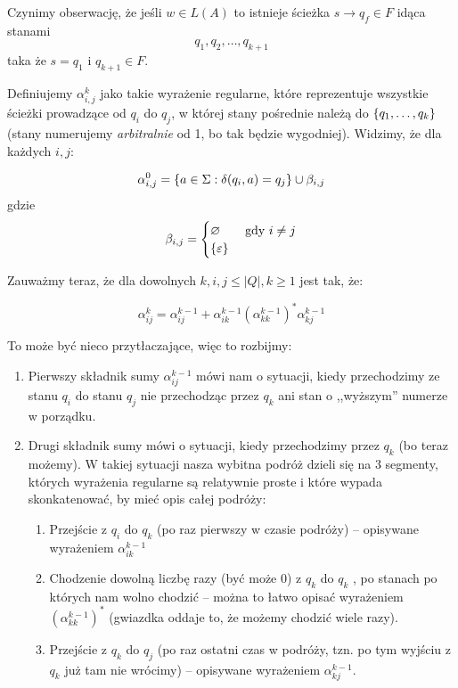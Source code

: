Czynimy obserwację, że jeśli \( w \in L(A) \) to istnieje ścieżka \( s \rightarrow q_f \in F \) idąca stanami
\[
	q_1, q_2, \dots, q_{k+1}
\]
taka że \( s = q_1 \) i \( q_{k+1} \in F\).

Definiujemy \( \alpha_{i, j}^k \) jako takie wyrażenie regularne, które reprezentuje wszystkie ścieżki prowadzące od \( q_i \) do \( q_j \), w której stany pośrednie należą do \( \set{q_1, \dots, q_k} \) (stany numerujemy \textit{arbitralnie} od 1, bo tak będzie wygodniej). Widzimy, że dla każdych \(i, j\):

\[
	\alpha_{i, j}^0 = \set{a \in \Sigma : \delta(q_i, a) = q_j } \cup \beta_{i, j}
\]
gdzie
\[
	\beta_{i, j} = \begin{cases}
		\varnothing & \text{ gdy } i \neq j \\
		\set{\eps}
	\end{cases}
\]

Zauważmy teraz, że dla dowolnych \(k, i, j \leq |Q|, k \geq 1 \) jest tak, że:

\[
	\alpha^{k}_{ij} = \alpha^{k-1}_{ij} + \alpha^{k-1}_{ik} (\alpha^{k-1}_{kk})^* \alpha^{k-1}_{kj}
\]

To może być nieco przytłaczające, więc to rozbijmy:

\begin{enumerate}
	\item Pierwszy składnik sumy \( \alpha^{k-1}_{ij} \) mówi nam o sytuacji, kiedy przechodzimy ze stanu \(q_i\) do stanu \(q_j\) nie przechodząc przez \(q_k\)  ani stan o ,,wyższym'' numerze w porządku.
	\item Drugi składnik sumy mówi o sytuacji, kiedy przechodzimy przez \(q_k\) (bo teraz możemy). W takiej sytuacji nasza wybitna podróż dzieli się na 3 segmenty, których wyrażenia regularne są relatywnie proste i które wypada skonkatenować, by mieć opis całej podróży:

	      \begin{enumerate}
		      \item Przejście z \(q_i\) do \(q_k\) (po raz pierwszy w czasie podróży) -- opisywane wyrażeniem \(\alpha^{k-1}_{ik}\)
		      \item Chodzenie dowolną liczbę razy (być może 0) z \(q_k\) do \(q_k\) , po stanach po których nam wolno chodzić -- można to łatwo opisać wyrażeniem \( (\alpha^{k-1}_{kk})^* \) (gwiazdka oddaje to, że możemy chodzić wiele razy).
		      \item Przejście z \(q_k\) do \(q_j\) (po raz ostatni czas w podróży, tzn. po tym wyjściu z \(q_k\) już tam nie wrócimy) -- opisywane wyrażeniem \( \alpha^{k-1}_{kj}  \).
	      \end{enumerate}
\end{enumerate}

